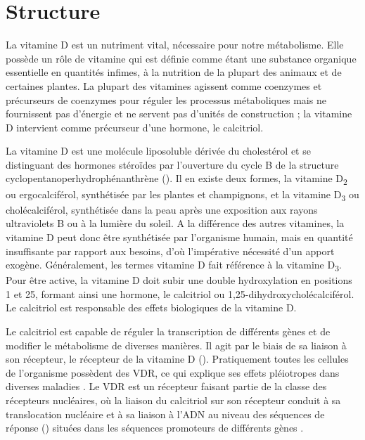 \documentclass[
  a4paper,
  DIV=11,
  numbers=noendperiod,
  listof=totoc]{scrreprt}
\begin{document}
\section{Structure}\label{structure}

La vitamine D est un nutriment vital, nécessaire pour notre métabolisme.
Elle possède un rôle de vitamine qui est définie comme étant une
substance organique essentielle en quantités infimes, à la nutrition de
la plupart des animaux et de certaines plantes. La plupart des vitamines
agissent comme coenzymes et précurseurs de coenzymes pour réguler les
processus métaboliques mais ne fournissent pas d'énergie et ne servent
pas d'unités de construction \autocite{Ellison.2021} ; la vitamine D
intervient comme précurseur d'une hormone, le calcitriol.

La vitamine D est une molécule liposoluble dérivée du cholestérol et se
distinguant des hormones stéroïdes par l'ouverture du cycle B de la
structure cyclopentanoperhydrophénanthrène \autocite{Norman.2008}
(). Il en existe deux formes, la vitamine
D\textsubscript{2} ou ergocalciférol, synthétisée par les plantes et
champignons, et la vitamine D\textsubscript{3} ou cholécalciférol,
synthétisée dans la peau après une exposition aux rayons ultraviolets B
ou à la lumière du soleil. A la différence des autres vitamines, la
vitamine D peut donc être synthétisée par l'organisme humain, mais en
quantité insuffisante par rapport aux besoins, d'où l'impérative
nécessité d'un apport exogène. Généralement, les termes vitamine D fait
référence à la vitamine D\textsubscript{3}. Pour être active, la
vitamine D doit subir une double hydroxylation en positions 1 et 25,
formant ainsi une hormone, le calcitriol ou
1,25-dihydroxycholécalciférol. Le calcitriol est responsable des effets
biologiques de la vitamine D.

Le calcitriol est capable de réguler la transcription de différents
gènes et de modifier le métabolisme de diverses manières. Il agit par le
biais de sa liaison à son récepteur, le récepteur de la vitamine D
(). Pratiquement toutes les cellules de l'organisme possèdent
des \ac{VDR}, ce qui explique ses effets pléiotropes dans diverses
maladies \autocite{Ellison.2021,Caprio.2017,Norman.2008}. Le \ac{VDR}
est un récepteur faisant partie de la classe des récepteurs nucléaires,
où la liaison du calcitriol sur son récepteur conduit à sa translocation
nucléaire et à sa liaison à l'ADN au niveau des séquences de réponse
() situées dans les séquences promoteurs de différents gènes
\autocite{Bouillon.2008}.
\end{document}
